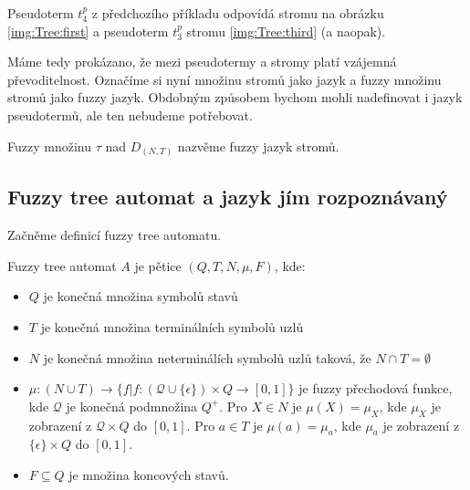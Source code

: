 \documentclass[a4paper,10pt]{article}
\begin{document}
\begin{example} 
 Pseudoterm $t^p_4$ z předchozího příkladu odpovídá stromu na obrázku \ref{img:Tree:first} a pseudoterm $t^p_3$ stromu \ref{img:Tree:third} (a naopak).
\end{example}

Máme tedy prokázano, že mezi pseudotermy a stromy platí vzájemná převoditelnost. Označíme si nyní množinu stromů jako jazyk a fuzzy množinu stromů jako fuzzy jazyk. Obdobným způsobem bychom mohli nadefinovat i jazyk pseudotermů, ale ten nebudeme potřebovat.

\begin{definition}
 Fuzzy množinu $\tau$ nad $D_{(N,T)}$ nazvěme fuzzy jazyk stromů.
\end{definition}


\subsection{Fuzzy tree automat a jazyk jím rozpoznávaný}
Začněme definicí fuzzy tree automatu.

\begin{definition}
 Fuzzy tree automat $A$ je pětice $(Q, T, N, \mu, F)$, kde:
 \begin{itemize}
  \item $Q$ je konečná množina symbolů stavů
  \item $T$ je konečná množina terminálních symbolů uzlů
  \item $N$ je konečná množina neterminálích symbolů uzlů taková, že $N \cap T = \emptyset$
  \item $\mu: (N \cup T) \rightarrow \{ f | f: (\mathcal{Q} \cup \{ \epsilon \}) \times Q \rightarrow [0,1]  \}$ je fuzzy přechodová funkce, kde $\mathcal{Q}$ je konečná podmnožina $Q^+$. Pro $X \in N$ je $\mu(X) = \mu_X$, kde $\mu_X$ je zobrazení z $\mathcal{Q} \times Q$ do $[0,1]$. Pro $a \in T$ je $\mu(a) = \mu_a$, kde $\mu_a$ je zobrazení z $\{ \epsilon \} \times Q $ do $[0,1]$.
  \item $F \subseteq Q$ je množina koncových stavů.
 \end{itemize}
\end{definition}
\end{document}
